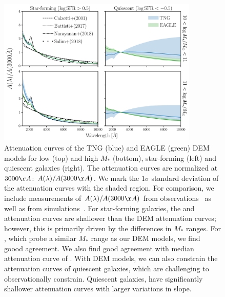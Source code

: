 \begin{figure}
\begin{center}
    \includegraphics[width=0.85\textwidth]{figs/abc_attenuation.pdf}
    \caption{\label{fig:atten}
    Attenuation curves of the TNG (blue) and EAGLE (green) DEM models for 
    low (top) and high $M_*$ (bottom), star-forming (left) and
    quiescent galaxies (right). The attenuation curves are normalized at
    $3000\AA$: $A(\lambda)/A(3000\AA)$. We mark the $1\sigma$ standard
    deviation of the attenuation curves with the shaded region. For comparison,
    we include measurements of $A(\lambda)/A(3000\AA)$ from 
    observations~\citep{caleztti2000, battisti2017, salim2018} as well as
    from simulations~\citep{narayanan2018}. For star-forming galaxies, the 
    \cite{calzetti2000} and \cite{battisti2017} attenuation curves are shallower 
    than the DEM attenuation curves; however, this is primarily driven by the
    differences in $M_*$ ranges. For \cite{salim2018}, which probe a similar
    $M_*$ range as our DEM models, we find goood agreement. We also find good 
    agreement with median attenuation curve of \cite{narayanan2018}. With DEM
    models, we can also constrain the attenuation curves of quiescent galaxies,
    which are challenging to observationally constrain. Quiescent galaxies,
    have significantly shallower attenuation curves with larger variations in
    slope. 
    }
\end{center}
\end{figure}




